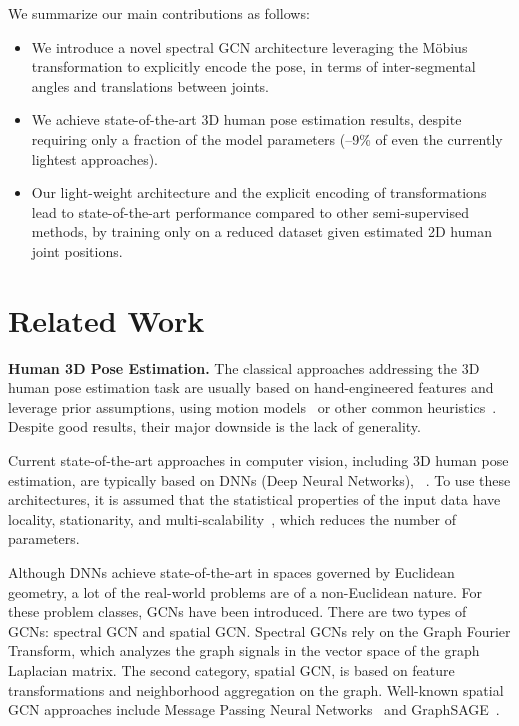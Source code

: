 \documentclass[runningheads]{llncs}
\begin{document}
We summarize our main contributions as follows:
\begin{itemize}
\itemsep0em
    \item We introduce a novel spectral GCN architecture leveraging the Möbius transformation to explicitly encode the pose, in terms of inter-segmental angles and translations between joints.
    \item We achieve state-of-the-art 3D human pose estimation results, despite requiring only a fraction of the model parameters (--9\% of even the currently lightest approaches).
    \item Our light-weight architecture and the explicit encoding of transformations lead to state-of-the-art performance compared to other semi-supervised methods, by training only on a reduced dataset given estimated 2D human joint positions.
\end{itemize}


\section{Related Work}

\textbf{Human 3D Pose Estimation.} The classical approaches addressing the 3D human pose estimation task are usually based on hand-engineered features and leverage prior assumptions, \eg using motion models~\cite{sminchisescu20083d} or other common heuristics~\cite{h36m_pami, ramakrishna2012reconstructing}. Despite good results, their major downside is the lack of generality.

Current state-of-the-art approaches in computer vision, including 3D human pose estimation, are typically based on DNNs (Deep Neural Networks), \eg~\cite{sarandi2020metrabs, luo2021multi, ma2021context, li2019generating}. To use these architectures, it is assumed that the statistical properties of the input data have locality, stationarity, and multi-scalability~\cite{henaff2015deep}, which reduces the number of parameters.

Although DNNs achieve state-of-the-art in spaces governed by Euclidean geometry, a lot of the real-world problems are of a non-Euclidean nature. For these problem classes, GCNs have been introduced. There are two types of GCNs: spectral GCN and spatial GCN. Spectral GCNs rely on the Graph Fourier Transform, which analyzes the graph signals in the vector space of the graph Laplacian matrix. The second category, spatial GCN, is based on feature transformations and neighborhood aggregation on the graph. Well-known spatial GCN approaches include Message Passing Neural Networks~\cite{gilmer2017neural} and GraphSAGE~\cite{hamilton2017inductive}. 
\end{document}
